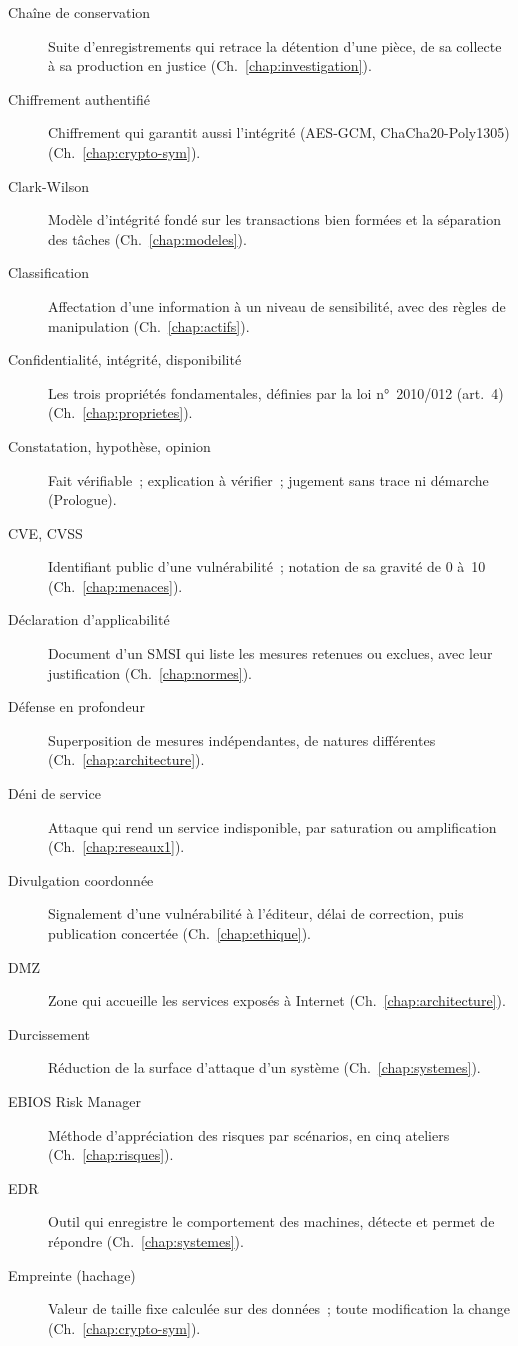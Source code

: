 \begin{description}
    \item[Chaîne de conservation] Suite d'enregistrements qui retrace la détention d'une pièce, de sa collecte à sa production en justice (Ch.~\ref{chap:investigation}).
    \item[Chiffrement authentifié] Chiffrement qui garantit aussi l'intégrité (AES-GCM, ChaCha20-Poly1305) (Ch.~\ref{chap:crypto-sym}).
    \item[Clark-Wilson] Modèle d'intégrité fondé sur les transactions bien formées et la séparation des tâches (Ch.~\ref{chap:modeles}).
    \item[Classification] Affectation d'une information à un niveau de sensibilité, avec des règles de manipulation (Ch.~\ref{chap:actifs}).
    \item[Confidentialité, intégrité, disponibilité] Les trois propriétés fondamentales, définies par la loi n°~2010/012 (art.~4) (Ch.~\ref{chap:proprietes}).
    \item[Constatation, hypothèse, opinion] Fait vérifiable~; explication à vérifier~; jugement sans trace ni démarche (Prologue).
    \item[CVE, CVSS] Identifiant public d'une vulnérabilité~; notation de sa gravité de 0 à~10 (Ch.~\ref{chap:menaces}).
    \item[Déclaration d'applicabilité] Document d'un SMSI qui liste les mesures retenues ou exclues, avec leur justification (Ch.~\ref{chap:normes}).
    \item[Défense en profondeur] Superposition de mesures indépendantes, de natures différentes (Ch.~\ref{chap:architecture}).
    \item[Déni de service] Attaque qui rend un service indisponible, par saturation ou amplification (Ch.~\ref{chap:reseaux1}).
    \item[Divulgation coordonnée] Signalement d'une vulnérabilité à l'éditeur, délai de correction, puis publication concertée (Ch.~\ref{chap:ethique}).
    \item[DMZ] Zone qui accueille les services exposés à Internet (Ch.~\ref{chap:architecture}).
    \item[Durcissement] Réduction de la surface d'attaque d'un système (Ch.~\ref{chap:systemes}).
    \item[EBIOS Risk Manager] Méthode d'appréciation des risques par scénarios, en cinq ateliers (Ch.~\ref{chap:risques}).
    \item[EDR] Outil qui enregistre le comportement des machines, détecte et permet de répondre (Ch.~\ref{chap:systemes}).
    \item[Empreinte (hachage)] Valeur de taille fixe calculée sur des données~; toute modification la change (Ch.~\ref{chap:crypto-sym}).

\end{description}
